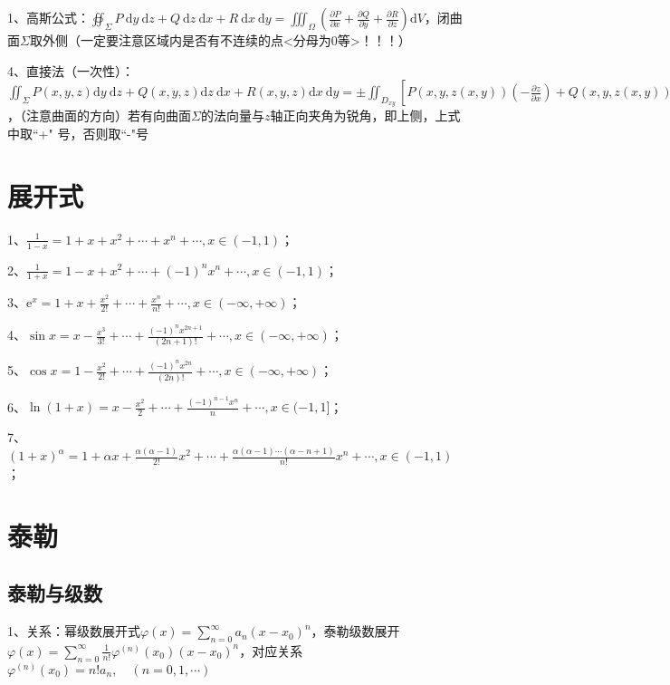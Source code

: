 1、高斯公式：$\oiint_{\Sigma} P \mathrm{~d} y \mathrm{~d} z+Q \mathrm{~d} z \mathrm{~d} x+R \mathrm{~d} x \mathrm{~d} y=\iiint_{\Omega}\left(\frac{\partial P}{\partial x}+\frac{\partial Q}{\partial y}+\frac{\partial R}{\partial z}\right) \mathrm{d} V$，闭曲面$\Sigma$取外侧（一定要注意区域内是否有不连续的点<分母为0等>！！！）

4、直接法（一次性）：$\iint_{\Sigma} P(x, y, z) \mathrm{d} y \mathrm{~d} z+Q(x, y, z) \mathrm{d} z \mathrm{~d} x+R(x, y, z) \mathrm{d} x \mathrm{~d} y = \pm \iint_{D_{x y}}[P(x, y, z(x, y))\left(-\frac{\partial z}{\partial x}\right)+Q(x, y, z(x, y))\left(-\frac{\partial z}{\partial y}\right)+R(x, y, z(x, y))] \mathrm{d} x \mathrm{~d} y$，（注意曲面的方向）若有向曲面$\Sigma$的法向量与$z$轴正向夹角为锐角，即上侧，上式中取“+" 号，否则取“-"号

\section{展开式}

1、$\frac{1}{1-x}=1+x+x^{2}+\cdots+x^{n}+\cdots, x \in(-1,1)$；

2、$\frac{1}{1+x}=1-x+x^{2}+\cdots+(-1)^{n} x^{n}+\cdots, x \in(-1,1)$；

3、$\mathrm{e}^{x}=1+x+\frac{x^{2}}{2 !}+\cdots+\frac{x^{n}}{n !}+\cdots, x \in(-\infty,+\infty)$；

4、$\sin x=x-\frac{x^{3}}{3 !}+\cdots+\frac{(-1)^{n} x^{2 n+1}}{(2 n+1) !}+\cdots, x \in(-\infty,+\infty)$；

5、$\cos x=1-\frac{x^{2}}{2 !}+\cdots+\frac{(-1)^{n} x^{2 n}}{(2 n) !}+\cdots, x \in(-\infty,+\infty)$；

6、$\ln (1+x)=x-\frac{x^{2}}{2}+\cdots+\frac{(-1)^{n-1} x^{n}}{n}+\cdots, x \in(-1,1]$；

7、$(1+x)^{\alpha}=1+\alpha x+\frac{\alpha(\alpha-1)}{2 !} x^{2}+\cdots+\frac{\alpha(\alpha-1) \cdots(\alpha-n+1)}{n !} x^{n}+\cdots, x \in(-1,1)$；

\section{泰勒}



\subsection{泰勒与级数}

1、关系：幂级数展开式$\varphi(x)=\sum_{n=0}^{\infty} a_{n}\left(x-x_{0}\right)^{n}$，泰勒级数展开$\varphi(x)=\sum_{n=0}^{\infty} \frac{1}{n !} \varphi^{(n)}\left(x_{0}\right)\left(x-x_{0}\right)^{n}$，对应关系$\varphi^{(n)}\left(x_{0}\right)=n ! a_{n}, \quad(n=0,1, \cdots)$



